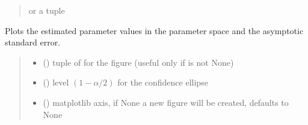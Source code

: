 \documentclass[letterpaper,10pt,english]{sphinxmanual}
\begin{document}
\begin{fulllineitems}
\begin{fulllineitems}
\begin{quote}
\begin{description}
\sphinxAtStartPar
{} or a tuple 

\end{description}\end{quote}

\end{fulllineitems}


\begin{fulllineitems}
\label{\detokenize{cubmods:cubmods.cush2.CUBresCUSH2.plot_par_space}}
\pysigstartsignatures
{}
\pysigstopsignatures
\sphinxAtStartPar
Plots the estimated parameter values in the parameter space and
the asymptotic standard error.
\begin{quote}\begin{description}
\begin{itemize}
\item {} 
\sphinxAtStartPar
{} () \textendash{} tuple of  for the figure (useful only if  is not None)

\item {} 
\sphinxAtStartPar
{} () \textendash{} level \((1-\alpha/2)\) for the confidence ellipse

\item {} 
\sphinxAtStartPar
{} (\sphinxstyleliteralemphasis{\sphinxupquote{, }}) \textendash{} matplotlib axis, if None a new figure will be created, defaults to None


\end{itemize}
\end{description}
\end{quote}
\end{fulllineitems}
\end{fulllineitems}
\end{document}
